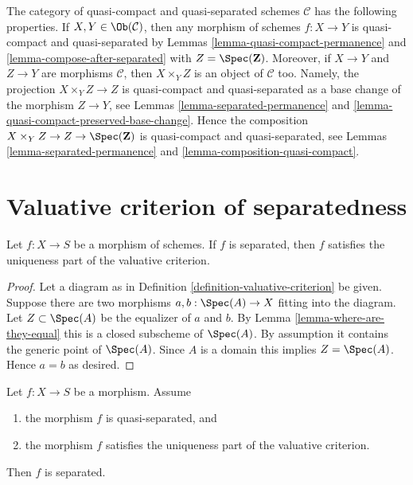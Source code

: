 \begin{remark}
\label{remark-quasi-compact-and-quasi-separated}
The category of quasi-compact and quasi-separated schemes $\mathcal{C}$
has the following properties. If $X, Y \in \Ob(\mathcal{C})$, then any
morphism of schemes $f : X \to Y$ is quasi-compact and quasi-separated by
Lemmas \ref{lemma-quasi-compact-permanence} and
\ref{lemma-compose-after-separated}
with $Z = \Spec(\mathbf{Z})$. Moreover, if $X \to Y$ and $Z \to Y$
are morphisms $\mathcal{C}$, then $X \times_Y Z$ is an object of $\mathcal{C}$
too. Namely, the projection $X \times_Y Z \to Z$ is quasi-compact and
quasi-separated as a base change of the morphism $Z \to Y$, see
Lemmas \ref{lemma-separated-permanence} and
\ref{lemma-quasi-compact-preserved-base-change}.
Hence the composition $X \times_Y Z \to Z \to \Spec(\mathbf{Z})$
is quasi-compact and quasi-separated, see
Lemmas \ref{lemma-separated-permanence} and
\ref{lemma-composition-quasi-compact}.
\end{remark}





\section{Valuative criterion of separatedness}
\label{section-valuative-separatedness}

\begin{lemma}
\label{lemma-separated-implies-valuative}
Let $f : X \to S$ be a morphism of schemes.
If $f$ is separated, then $f$ satisfies the uniqueness
part of the valuative criterion.
\end{lemma}

\begin{proof}
Let a diagram as in Definition \ref{definition-valuative-criterion}
be given. Suppose there are two morphisms
$a, b : \Spec(A) \to X$ fitting into the diagram.
Let $Z \subset \Spec(A)$ be the equalizer of $a$ and $b$.
By Lemma \ref{lemma-where-are-they-equal} this is a closed
subscheme of $\Spec(A)$. By assumption it contains
the generic point of $\Spec(A)$. Since $A$ is a domain
this implies $Z = \Spec(A)$. Hence $a = b$ as desired.
\end{proof}

\begin{lemma}
\label{lemma-valuative-criterion-separatedness}
\begin{reference}
\cite[II Proposition 7.2.3]{EGA}
\end{reference}
Let $f : X \to S$ be a morphism.
Assume
\begin{enumerate}
\item the morphism $f$ is quasi-separated, and
\item the morphism $f$ satisfies the uniqueness
part of the valuative criterion.
\end{enumerate}
Then $f$ is separated.
\end{lemma}

